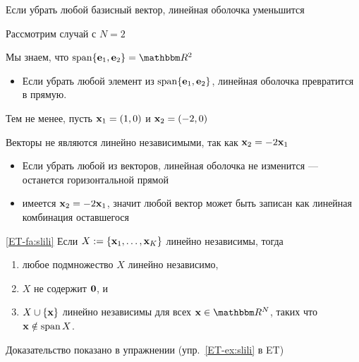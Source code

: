 \begin{frame}

    \vspace{2em}
    \Eg 
    Если убрать любой базисный вектор, линейная оболочка уменьшится

    Рассмотрим случай с $N=2$
    
    Мы знаем, что $\Span \{\bolde_1, \bolde_2\} = \RR^2$
    
    \begin{itemize}
    \item Если убрать любой элемент из $\operatorname{span} \{{\mathbf e}_1, {\mathbf e}_2\}$, линейная оболочка превратится в прямую. 
    \end{itemize}
    
\end{frame}

\begin{frame}

    \vspace{2em}
    Тем не менее, пусть ${\mathbf x}_1 = (1,0)$ и ${\mathbf x}_2 = (-2,0)$
    
    \vspace{1em}
    Векторы не являются линейно независимыми, так как ${\mathbf x}_2 = -2{\mathbf x}_1$
        \begin{itemize}
            \item Если убрать любой из векторов, линейная оболочка не изменится --- останется горизонтальной прямой 
            \item имеется ${\mathbf x}_2 = -2
            {\mathbf x}_1$, значит любой вектор может быть записан как линейная комбинация оставшегося
        \end{itemize}
        
        \begin{center}
            
        \end{center}
 \end{frame}


\begin{frame}

    \vspace{2em}
    \Fact\eqref{ET-fa:slili}
        Если $X := \{{\mathbf x}_1,\ldots, {\mathbf x}_K\}$ линейно независимы, тогда
        \begin{enumerate}
            \item любое подмножество $X$ линейно независимо, 
            \item $X$ не содержит ${\mathbf 0}$, и
            \item $X \cup \{ {\mathbf x} \}$ линейно независимы для всех $\boldx
                \in \RR^N$, таких что ${\mathbf x} \notin \operatorname{span} X$.
        \end{enumerate}
   
    Доказательство показано в упражнении (упр.~\ref{ET-ex:slili} в ET)
\end{frame}

